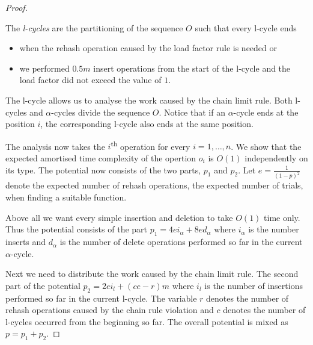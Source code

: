 \begin{proof}
\begin{definition}[l-cycle]
The \emph{l-cycles} are the partitioning of the sequence $O$ such that every l-cycle ends
\begin{itemize}
\item when the rehash operation caused by the load factor rule is needed or
\item we performed $0.5 m$ insert operations from the start of the l-cycle and the load factor did not exceed the value of $1$.
\end{itemize}
\end{definition}
The l-cycle allows us to analyse the work caused by the chain limit rule. Both l-cycles and $\alpha$-cycles divide the sequence $O$. Notice that if an $\alpha$-cycle ends at the position $i$, the corresponding l-cycle also ends at the same position. 

The analysis now takes the $i$\textsuperscript{th} operation for every $i = 1, \dots, n$. We show that the expected amortised time complexity of the opertion $o_i$ is $O(1)$ independently on its type. The potential now consists of the two parts, $p_1$ and $p_2$. Let $e = \frac{1}{(1 - p) ^ 2}$ denote the expected number of rehash operations, the expected number of trials, when finding a suitable function. 

Above all we want every simple insertion and deletion to take $O(1)$ time only. Thus the potential consists of the part $p_1 = 4ei_{\alpha} + 8ed_{\alpha}$ where $i_{\alpha}$ is the number inserts and $d_{\alpha}$ is the number of delete operations performed so far in the current $\alpha$-cycle. 

Next we need to distribute the work caused by the chain limit rule. The second part of the potential $p_2 = 2ei_{l} + (ce - r) m$ where $i_l$ is the number of insertions performed so far in the current l-cycle. The variable $r$ denotes the number of rehash operations caused by the chain rule violation and $c$ denotes the number of l-cycles occurred from the beginning so far. The overall potential is mixed as $p = p_1 + p_2$.


\end{proof}
